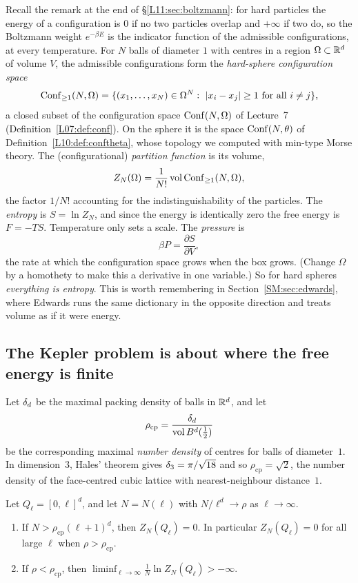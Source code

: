 Recall the remark at the end of \S\ref{L11:sec:boltzmann}: for hard particles the energy of a
configuration is $0$ if no two particles overlap and $+\infty$ if two do, so the Boltzmann weight
$e^{-\beta E}$ is the indicator function of the admissible configurations, at every temperature.
For $N$ balls of diameter $1$ with centres in a region $\Omega\subset\mathbb{R}^d$ of volume $V$, the
admissible configurations form the \emph{hard-sphere configuration space}
\[
  \Conf_{\ge1}(N,\Omega)=\{(x_1,\dots,x_N)\in\Omega^N:\ \abs{x_i-x_j}\ge1\ \text{for all }i\ne j\},
\]
a closed subset of the configuration space $\operatorname{Conf}(N,\Omega)$ of Lecture~7
(Definition~\ref{L07:def:conf}). On the sphere it is the space $\operatorname{Conf}(N,\theta)$ of
Definition~\ref{L10:def:conftheta}, whose topology we computed with min-type Morse theory. The
(configurational) \emph{partition function} is its volume,
\[
  Z_N(\Omega)=\frac1{N!}\operatorname{vol}\operatorname{Conf}_{\ge1}(N,\Omega),
\]
the factor $1/N!$ accounting for the indistinguishability of the particles. The \emph{entropy} is
$S=\ln Z_N$, and since the energy is identically zero the free energy is $F=-TS$. Temperature only
sets a scale. The \emph{pressure} is
\[
  \beta P=\frac{\partial S}{\partial V},
\]
the rate at which the configuration space grows when the box grows. (Change $\Omega$ by a homothety
to make this a derivative in one variable.) So for hard spheres \emph{everything is entropy}. This
is worth remembering in Section~\ref{SM:sec:edwards}, where Edwards runs the same dictionary in the
opposite direction and treats volume as if it were energy.

\subsection*{The Kepler problem is about where the free energy is finite}

Let $\delta_d$ be the maximal packing density of balls in $\mathbb{R}^d$, and let
\[
  \rho_{\mathrm{cp}}=\frac{\delta_d}{\operatorname{vol}B^d(\tfrac12)}
\]
be the corresponding maximal \emph{number density} of centres for balls of diameter~$1$. In
dimension~$3$, Hales' theorem gives $\delta_3=\pi/\sqrt{18}$ and so $\rho_{\mathrm{cp}}=\sqrt2$, the
number density of the face-centred cubic lattice with nearest-neighbour distance~$1$.

\begin{proposition}\label{SM:prop:kepler}
Let $Q_\ell=[0,\ell]^d$, and let $N=N(\ell)$ with $N/\ell^d\to\rho$ as $\ell\to\infty$.
\begin{enumerate}[nosep]
\item If $N>\rho_{\mathrm{cp}}(\ell+1)^d$, then $Z_N(Q_\ell)=0$. In particular $Z_N(Q_\ell)=0$ for all
  large $\ell$ when $\rho>\rho_{\mathrm{cp}}$.
\item If $\rho<\rho_{\mathrm{cp}}$, then $\liminf_{\ell\to\infty}\frac1N\ln Z_N(Q_\ell)>-\infty$.
\end{enumerate}
\end{proposition}

